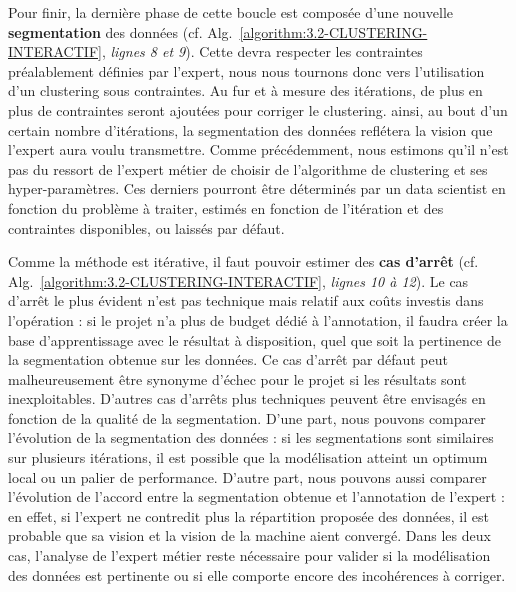 		Pour finir, la dernière phase de cette boucle est composée d'une nouvelle \textbf{segmentation} des données (cf. Alg.~\ref{algorithm:3.2-CLUSTERING-INTERACTIF}, \textit{lignes 8 et 9}). Cette devra respecter les contraintes préalablement définies par l'expert, nous nous tournons donc vers l'utilisation d'un clustering sous contraintes.
		Au fur et à mesure des itérations, de plus en plus de contraintes seront ajoutées pour corriger le clustering. ainsi, au bout d'un certain nombre d'itérations, la segmentation des données reflétera la vision que l'expert aura voulu transmettre.
		Comme précédemment, nous estimons qu'il n'est pas du ressort de l'expert métier de choisir de l'algorithme de clustering et ses hyper-paramètres. Ces derniers pourront être déterminés par un data scientist en fonction du problème à traiter, estimés en fonction de l'itération et des contraintes disponibles, ou laissés par défaut.
		
		Comme la méthode est itérative, il faut pouvoir estimer des \textbf{cas d'arrêt} (cf. Alg.~\ref{algorithm:3.2-CLUSTERING-INTERACTIF}, \textit{lignes 10 à 12}).
		Le cas d'arrêt le plus évident n'est pas technique mais relatif aux coûts investis dans l'opération : si le projet n'a plus de budget dédié à l'annotation, il faudra créer la base d'apprentissage avec le résultat à disposition, quel que soit la pertinence de la segmentation obtenue sur les données. Ce cas d'arrêt par défaut peut malheureusement être synonyme d'échec pour le projet si les résultats sont inexploitables.
		D'autres cas d'arrêts plus techniques peuvent être envisagés en fonction de la qualité de la segmentation.
		D'une part, nous pouvons comparer l'évolution de la segmentation des données : si les segmentations sont similaires sur plusieurs itérations, il est possible que la modélisation atteint un optimum local ou un palier de performance. D'autre part, nous pouvons aussi comparer l'évolution de l'accord entre la segmentation obtenue et l'annotation de l'expert : en effet, si l'expert ne contredit plus la répartition proposée des données, il est probable que sa vision et la vision de la machine aient convergé.
		Dans les deux cas, l'analyse de l'expert métier reste nécessaire pour valider si la modélisation des données est pertinente ou si elle comporte encore des incohérences à corriger.


